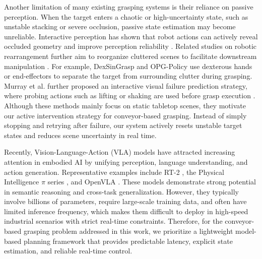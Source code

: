 Another limitation of many existing grasping systems is their reliance on passive perception. When the target enters a chaotic or high-uncertainty state, such as unstable stacking or severe occlusion, passive state estimation may become unreliable. Interactive perception has shown that robot actions can actively reveal occluded geometry and improve perception reliability \cite{bohg2017interactive}. Related studies on robotic rearrangement further aim to reorganize cluttered scenes to facilitate downstream manipulation \cite{batra2020rearrangement}. For example, DexSinGrasp \cite{xu2025dexsingrasp} and OPG-Policy \cite{ding2024opg} use dexterous hands or end-effectors to separate the target from surrounding clutter during grasping. Murray et al. further proposed an interactive visual failure prediction strategy, where probing actions such as lifting or shaking are used before grasp execution \cite{murray2024learning}. Although these methods mainly focus on static tabletop scenes, they motivate our active intervention strategy for conveyor-based grasping. Instead of simply stopping and retrying after failure, our system actively resets unstable target states and reduces scene uncertainty in real time.

Recently, Vision-Language-Action (VLA) models have attracted increasing attention in embodied AI by unifying perception, language understanding, and action generation. Representative examples include RT-2 \cite{zitkovich2023rt}, the Physical Intelligence $\pi$ series \cite{black2024pi_0, intelligence2025vision}, and OpenVLA \cite{kim2024openvla}. These models demonstrate strong potential in semantic reasoning and cross-task generalization. However, they typically involve billions of parameters, require large-scale training data, and often have limited inference frequency, which makes them difficult to deploy in high-speed industrial scenarios with strict real-time constraints. Therefore, for the conveyor-based grasping problem addressed in this work, we prioritize a lightweight model-based planning framework that provides predictable latency, explicit state estimation, and reliable real-time control.
